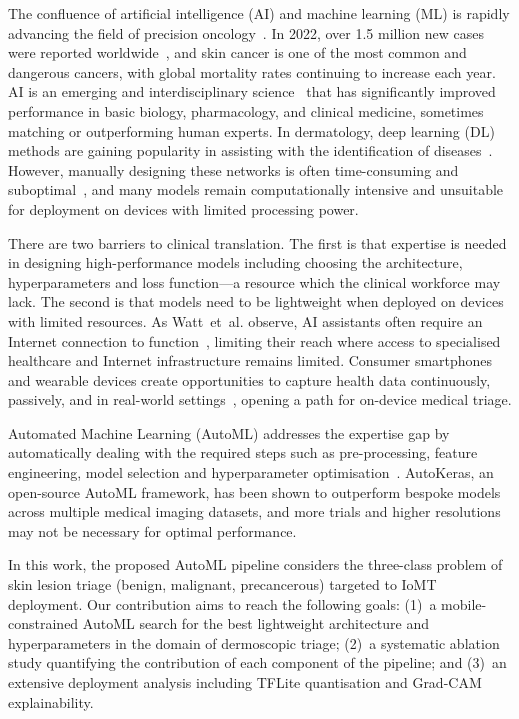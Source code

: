 \documentclass[conference]{IEEEtran}
\begin{document}
The confluence of artificial intelligence (AI) and machine learning (ML) is rapidly advancing the field of precision oncology~\cite{b4}. In 2022, over 1.5 million new cases were reported worldwide~\cite{b5}, and skin cancer is one of the most common and dangerous cancers, with global mortality rates continuing to increase each year. AI is an emerging and interdisciplinary science~\cite{b6} that has significantly improved performance in basic biology, pharmacology, and clinical medicine, sometimes matching or outperforming human experts. In dermatology, deep learning (DL) methods are gaining popularity in assisting with the identification of diseases~\cite{b7}. However, manually designing these networks is often time-consuming and suboptimal~\cite{b8}, and many models remain computationally intensive and unsuitable for deployment on devices with limited processing power.
 
There are two barriers to clinical translation. The first is that expertise is needed in designing high-performance models including choosing the architecture, hyperparameters and loss function---a resource which the clinical workforce may lack. The second is that models need to be lightweight when deployed on devices with limited resources. As Watt~et~al. observe, AI assistants often require an Internet connection to function~\cite{b9}, limiting their reach where access to specialised healthcare and Internet infrastructure remains limited. Consumer smartphones and wearable devices create opportunities to capture health data continuously, passively, and in real-world settings~\cite{b10}, opening a path for on-device medical triage.
 
Automated Machine Learning (AutoML) addresses the expertise gap by automatically dealing with the required steps such as pre-processing, feature engineering, model selection and hyperparameter optimisation~\cite{b11}. AutoKeras, an open-source AutoML framework, has been shown to outperform bespoke models across multiple medical imaging datasets, and more trials and higher resolutions may not be necessary for optimal performance.
 
In this work, the proposed AutoML pipeline considers the three-class problem of skin lesion triage (benign, malignant, precancerous) targeted to IoMT deployment. Our contribution aims to reach the following goals: (1)~a mobile-constrained AutoML search for the best lightweight architecture and hyperparameters in the domain of dermoscopic triage; (2)~a systematic ablation study quantifying the contribution of each component of the pipeline; and (3)~an extensive deployment analysis including TFLite quantisation and Grad-CAM explainability.
\end{document}
